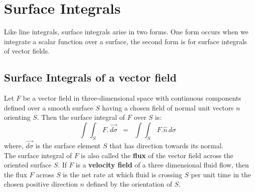 \documentclass[aima331_lecturenotes_ku.tex]{subfiles}
\begin{document}
\section{Surface Integrals}
Like line integrals, surface integrals arise in two forms. One form occurs when we integrate a scalar function over a surface, the second form is for surface integrals of vector fields.
\subsection{Surface Integrals of a vector field}
Let $F$ be a vector field in three-dimensional space with continuous components defined over a smooth surface $S$ having a chosen field of normal unit vectors $n$ orienting $S$. Then the surface integral of $F$ over $S$ is:
\begin{equation}
  \label{surf}
  \int\int_S \, F. \, \vec{d\sigma} \;\;= \;\; \int\int_S \, F. \hat{n}\, d\sigma
\end{equation}
where, $\vec{d\sigma}$ is the surface element $S$ that has direction towards its normal. \\[2mm]
The surface integral of $F$ is also called the \textbf{flux} of the vector field across the oriented surface $S$. If $F$ is a \textbf{velocity field} of a three dimensional fluid flow, then the flux $F$ across $S$ is the net rate at which fluid is crossing $S$ per unit time in the chosen positive direction $n$ defined by the orientation of $S$.
\end{document}
